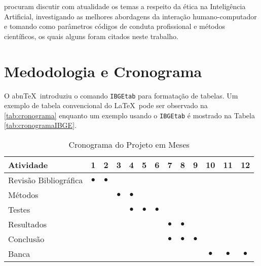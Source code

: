 \documentclass[
	12pt,				    %
	openright,			    %
	oneside,			    %
	a4paper,			    %
    sumario=tradicional,    %
	english,			    %
	brazil,				    %
	]{abntex2}              %
\begin{document}
 procuram discutir com atualidade os temas a respeito da ética na Inteligência Artificial, investigando as melhores abordagens da interação humano-computador e tomando como parâmetros códigos de conduta profissional e métodos científicos, os quais alguns foram citados neste trabalho.

\chapter{Medodologia e Cronograma}\label{sec:metodos}

O abn\TeX\ introduziu o comando \texttt{IBGEtab} para formatação de tabelas. Um exemplo de tabela convencional do \LaTeX\ pode ser observado na \autoref{tab:cronograma} enquanto um exemplo usando o \texttt{IBGEtab} é mostrado na Tabela \ref{tab:cronogramaIBGE}.

\begin{table}[htbp]
  \centering
    \caption[Cronograma Normal]{Cronograma do Projeto em Meses}
    \label{tab:cronograma}
    \begin{tabular}{lcccccccccccc} %
    \toprule
    \textbf{Atividade} & \textbf{1} & \textbf{2} & \textbf{3} & \textbf{4} & \textbf{5} & \textbf{6} & \textbf{7} & \textbf{8} & \textbf{9} & \textbf{10} & \textbf{11} & \textbf{12} \\
    \midrule
        Revisão Bibliográfica & $\bullet$ & $\bullet$ & & & & & & & & & & \\
        Métodos & & & $\bullet$ & $\bullet$ & & & & & & & & \\
        Testes & & & & $\bullet$ & $\bullet$ & $\bullet$ & & & & & & \\
        Resultados & & & & & & & $\bullet$ & $\bullet$ & & & & \\
        Conclusão & & & & & & & $\bullet$ & $\bullet$ & $\bullet$ & & & \\
        Banca & & & & & & &&&& $\bullet$ & $\bullet$ & $\bullet$ \\
    \bottomrule
    \end{tabular}%
\end{table}%
\end{document}
